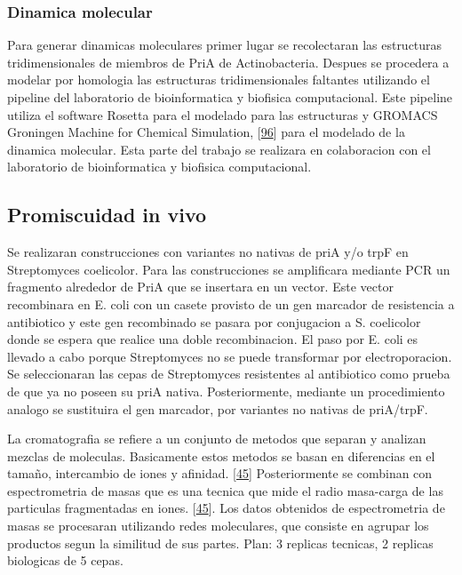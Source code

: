 \documentclass[12pt,twoside]{reedthesis}
\begin{document}
  \subsubsection{Dinamica molecular}\label{dinamica-molecular}
  
  Para generar dinamicas moleculares primer lugar se recolectaran las
  estructuras tridimensionales de miembros de PriA de Actinobacteria.
  Despues se procedera a modelar por homologia las estructuras
  tridimensionales faltantes utilizando el pipeline del laboratorio de
  bioinformatica y biofisica computacional. Este pipeline utiliza el
  software Rosetta para el modelado para las estructuras y GROMACS
  Groningen Machine for Chemical Simulation,
  {[}\protect\hyperlink{ref-van_der_spoel_gromacs_2005}{96}{]} para el
  modelado de la dinamica molecular. Esta parte del trabajo se realizara
  en colaboracion con el laboratorio de bioinformatica y biofisica
  computacional.
  
  \subsection{Promiscuidad in vivo}\label{promiscuidad-in-vivo}
  
  Se realizaran construcciones con variantes no nativas de priA y/o trpF
  en Streptomyces coelicolor. Para las construcciones se amplificara
  mediante PCR un fragmento alrededor de PriA que se insertara en un
  vector. Este vector recombinara en E. coli con un casete provisto de un
  gen marcador de resistencia a antibiotico y este gen recombinado se
  pasara por conjugacion a S. coelicolor donde se espera que realice una
  doble recombinacion. El paso por E. coli es llevado a cabo porque
  Streptomyces no se puede transformar por electroporacion. Se
  seleccionaran las cepas de Streptomyces resistentes al antibiotico como
  prueba de que ya no poseen su priA nativa. Posteriormente, mediante un
  procedimiento analogo se sustituira el gen marcador, por variantes no
  nativas de priA/trpF.
  
  La cromatografia se refiere a un conjunto de metodos que separan y
  analizan mezclas de moleculas. Basicamente estos metodos se basan en
  diferencias en el tamaño, intercambio de iones y afinidad.
  {[}\protect\hyperlink{ref-campbell_biophysical_2012}{45}{]}
  Posteriormente se combinan con espectrometria de masas que es una
  tecnica que mide el radio masa-carga de las particulas fragmentadas en
  iones. {[}\protect\hyperlink{ref-campbell_biophysical_2012}{45}{]}. Los
  datos obtenidos de espectrometria de masas se procesaran utilizando
  redes moleculares, que consiste en agrupar los productos segun la
  similitud de sus partes. Plan: 3 replicas tecnicas, 2 replicas
  biologicas de 5 cepas.
  
\end{document}
